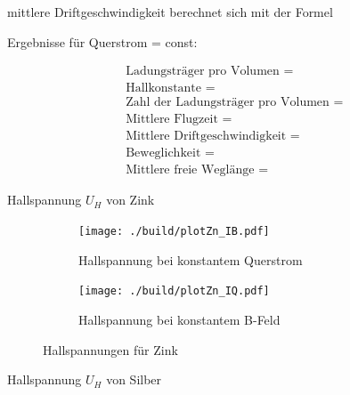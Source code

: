 \justifying mittlere Driftgeschwindigkeit berechnet sich mit der Formel 

Ergebnisse für Querstrom = const:

\begin{align}
&\text{Ladungsträger pro Volumen = }\\
&\text{Hallkonstante = }\\
&\text{Zahl der Ladungsträger pro Volumen = }\\
&\text{Mittlere Flugzeit = }\\
&\text{Mittlere Driftgeschwindigkeit = }\\
&\text{Beweglichkeit = }\\
&\text{Mittlere freie Weglänge = }
\end{align}


\begin{table}[H]
    \centering
    
    \caption{Hallspannung $U_H$ von Zink}
    \label{tab:}
\end{table}

\begin{figure}[H]
\begin{subfigure}{0.495\linewidth}
\centering
\texttt{[image: ./build/plotZn\_IB.pdf]}
\caption{Hallspannung bei konstantem Querstrom}
\end{subfigure}
\begin{subfigure}{0.495\linewidth}
\centering
\texttt{[image: ./build/plotZn\_IQ.pdf]}
\caption{Hallspannung bei konstantem B-Feld}
\end{subfigure}
\caption{Hallspannungen für Zink}
\end{figure}



\begin{table}[H]
    \centering
    
    \caption{Hallspannung $U_H$ von Silber}
    \label{tab:}
\end{table}

